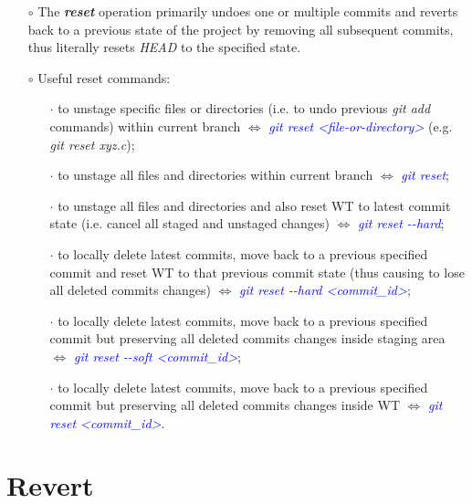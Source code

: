 \documentclass[a4paper,portrait,10pt]{article}   %
\newcommand{\mybulletlvA}{$\circ$}   %
\newcommand{\mybulletlvB}{$\cdot$}   %
\newcommand{\mydiv}{$\Leftrightarrow$ }   %
\newcommand{\mycmd}[1]{\textcolor{blue}{\textit{#1}}}   %
\newcommand{\myparvspace}{\vspace{4mm}}   %
\newcommand{\mysecvspace}{\vspace{6mm}}   %
\begin{document}
\begin{itemize}
\item[\mybulletlvA] The \textbf{\textit{reset}} operation primarily undoes one or multiple commits and reverts back to a previous state of the project by removing all subsequent commits, thus literally resets \textit{HEAD} to the specified state.
\myparvspace

\item[\mybulletlvA] Useful reset commands:
\begin{itemize}
  \item[\mybulletlvB] to unstage specific files or directories (i.e. to undo previous \textit{git add} commands) within current branch \mydiv \mycmd{git reset <file-or-directory>} (e.g. \textit{git reset xyz.c});
  \item[\mybulletlvB] to unstage all files and directories within current branch \mydiv \mycmd{git reset};
  \item[\mybulletlvB] to unstage all files and directories and also reset WT to latest commit state (i.e. cancel all staged and unstaged changes) \mydiv \mycmd{git reset -{}-hard};
  \item[\mybulletlvB] to locally delete latest commits, move back to a previous specified commit and reset WT to that previous commit state (thus causing to lose all deleted commits changes) \mydiv \mycmd{git reset -{}-hard <commit\_id>};
  \item[\mybulletlvB] to locally delete latest commits, move back to a previous specified commit but preserving all deleted commits changes inside staging area \mydiv \mycmd{git reset -{}-soft <commit\_id>};
  \item[\mybulletlvB] to locally delete latest commits, move back to a previous specified commit but preserving all deleted commits changes inside WT \mydiv \mycmd{git reset <commit\_id>}.
\end{itemize}
\end{itemize}
\mysecvspace


\section{Revert}   \label{sec:Revert}
\end{document}
